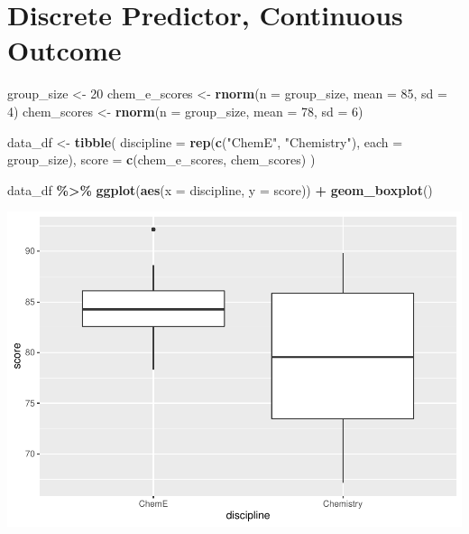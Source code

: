 \documentclass[
]{book}
\newenvironment{Shaded}{\begin{snugshade}}{\end{snugshade}}
\newcommand{\DataTypeTok}[1]{\textcolor[rgb]{0.13,0.29,0.53}{#1}}
\newcommand{\DecValTok}[1]{\textcolor[rgb]{0.00,0.00,0.81}{#1}}
\newcommand{\KeywordTok}[1]{\textcolor[rgb]{0.13,0.29,0.53}{\textbf{#1}}}
\newcommand{\NormalTok}[1]{#1}
\newcommand{\OperatorTok}[1]{\textcolor[rgb]{0.81,0.36,0.00}{\textbf{#1}}}
\newcommand{\StringTok}[1]{\textcolor[rgb]{0.31,0.60,0.02}{#1}}
\begin{document}
\hypertarget{discrete-predictor-continuous-outcome}{%
\section{Discrete Predictor, Continuous Outcome}\label{discrete-predictor-continuous-outcome}}

\begin{Shaded}
\begin{Highlighting}[]
\NormalTok{group\_size \textless{}{-}}\StringTok{ }\DecValTok{20}
\NormalTok{chem\_e\_scores \textless{}{-}}\StringTok{ }\KeywordTok{rnorm}\NormalTok{(}\DataTypeTok{n =}\NormalTok{ group\_size, }\DataTypeTok{mean =} \DecValTok{85}\NormalTok{, }\DataTypeTok{sd =} \DecValTok{4}\NormalTok{)}
\NormalTok{chem\_scores \textless{}{-}}\StringTok{ }\KeywordTok{rnorm}\NormalTok{(}\DataTypeTok{n =}\NormalTok{ group\_size, }\DataTypeTok{mean =} \DecValTok{78}\NormalTok{, }\DataTypeTok{sd =} \DecValTok{6}\NormalTok{)}


\NormalTok{data\_df \textless{}{-}}\StringTok{ }\KeywordTok{tibble}\NormalTok{(}
  \DataTypeTok{discipline =} \KeywordTok{rep}\NormalTok{(}\KeywordTok{c}\NormalTok{(}\StringTok{"ChemE"}\NormalTok{, }\StringTok{"Chemistry"}\NormalTok{), }\DataTypeTok{each =}\NormalTok{ group\_size),}
  \DataTypeTok{score =} \KeywordTok{c}\NormalTok{(chem\_e\_scores, chem\_scores)}
\NormalTok{)}

\NormalTok{data\_df }\OperatorTok{\%\textgreater{}\%}\StringTok{ }
\StringTok{  }\KeywordTok{ggplot}\NormalTok{(}\KeywordTok{aes}\NormalTok{(}\DataTypeTok{x =}\NormalTok{ discipline, }\DataTypeTok{y =}\NormalTok{ score)) }\OperatorTok{+}
\StringTok{  }\KeywordTok{geom\_boxplot}\NormalTok{()}
\end{Highlighting}
\end{Shaded}

\includegraphics{test_course_notes_files/figure-latex/boxplot-example-1.pdf}
\end{document}

